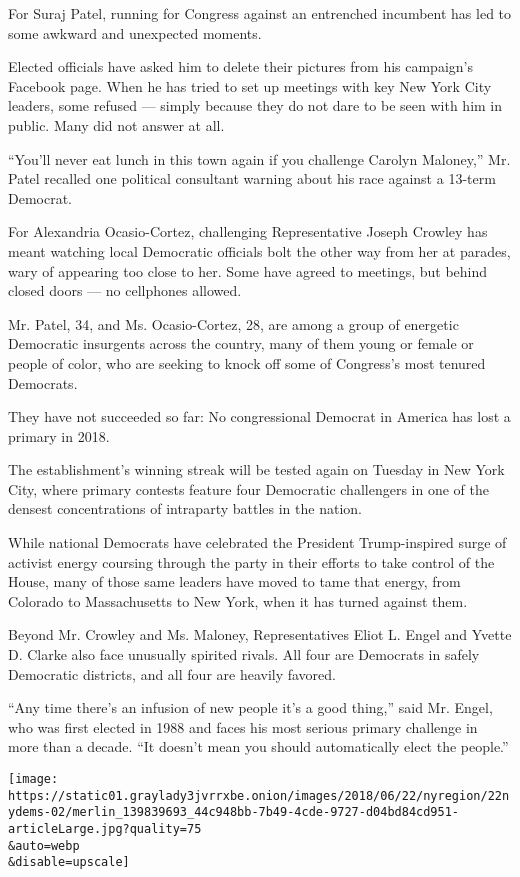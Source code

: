 For Suraj Patel, running for Congress against an entrenched incumbent
has led to some awkward and unexpected moments.

Elected officials have asked him to delete their pictures from his
campaign's Facebook page. When he has tried to set up meetings with key
New York City leaders, some refused --- simply because they do not dare
to be seen with him in public. Many did not answer at all.

``You'll never eat lunch in this town again if you challenge Carolyn
Maloney,'' Mr. Patel recalled one political consultant warning about his
race against a 13-term Democrat.

For Alexandria Ocasio-Cortez, challenging Representative Joseph Crowley
has meant watching local Democratic officials bolt the other way from
her at parades, wary of appearing too close to her. Some have agreed to
meetings, but behind closed doors --- no cellphones allowed.

Mr. Patel, 34, and Ms. Ocasio-Cortez, 28, are among a group of energetic
Democratic insurgents across the country, many of them young or female
or people of color, who are seeking to knock off some of Congress's most
tenured Democrats.

They have not succeeded so far: No congressional Democrat in America has
lost a primary in 2018.

The establishment's winning streak will be tested again on Tuesday in
New York City, where primary contests feature four Democratic
challengers in one of the densest concentrations of intraparty battles
in the nation.

While national Democrats have celebrated the President Trump-inspired
surge of activist energy coursing through the party in their efforts to
take control of the House, many of those same leaders have moved to tame
that energy, from Colorado to Massachusetts to New York, when it has
turned against them.

Beyond Mr. Crowley and Ms. Maloney, Representatives Eliot L. Engel and
Yvette D. Clarke also face unusually spirited rivals. All four are
Democrats in safely Democratic districts, and all four are heavily
favored.

``Any time there's an infusion of new people it's a good thing,'' said
Mr. Engel, who was first elected in 1988 and faces his most serious
primary challenge in more than a decade. ``It doesn't mean you should
automatically elect the people.''

\texttt{[image: https://static01.graylady3jvrrxbe.onion/images/2018/06/22/nyregion/22nydems-02/merlin\_139839693\_44c948bb-7b49-4cde-9727-d04bd84cd951-articleLarge.jpg?quality=75\\\&auto=webp\\\&disable=upscale]}

